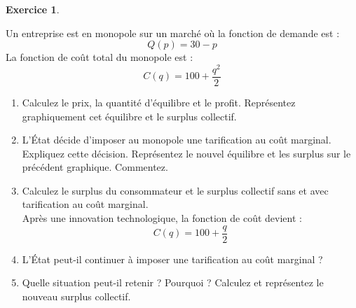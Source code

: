 \documentclass[
]{book}
\theoremstyle{definition}
\theoremstyle{definition}
\theoremstyle{definition}
\newtheorem{exercise}{Exercice}[chapter]
\theoremstyle{definition}
\theoremstyle{remark}
\begin{document}
\begin{exercise}
\protect\hypertarget{exr:naturelexo2}{}\label{exr:naturelexo2}

Un entreprise est en monopole sur un marché où la fonction de
demande est :
\[Q\left(p\right)=30-p\]
La fonction de coût total du monopole est :
\[C(q)=100+\frac{q^2}{2}\]

\begin{enumerate}
\def\labelenumi{\arabic{enumi}.}
\item
  Calculez le prix, la quantité d'équilibre et le profit. Représentez graphiquement cet équilibre et le surplus collectif.
\item
  L'État décide d'imposer au monopole une tarification au coût marginal. Expliquez cette décision. Représentez le nouvel équilibre et les surplus sur le précédent graphique. Commentez.
\item
  Calculez le surplus du consommateur et le surplus collectif sans et avec tarification au coût marginal.\\
  Après une innovation technologique, la fonction de coût devient :
  \[C(q)=100+\frac{q}{2}\]
\item
  L'État peut-il continuer à imposer une tarification au coût marginal ?
\item
  Quelle situation peut-il retenir ? Pourquoi ? Calculez et représentez le nouveau surplus collectif.
\end{enumerate}

\end{exercise}
\end{document}
